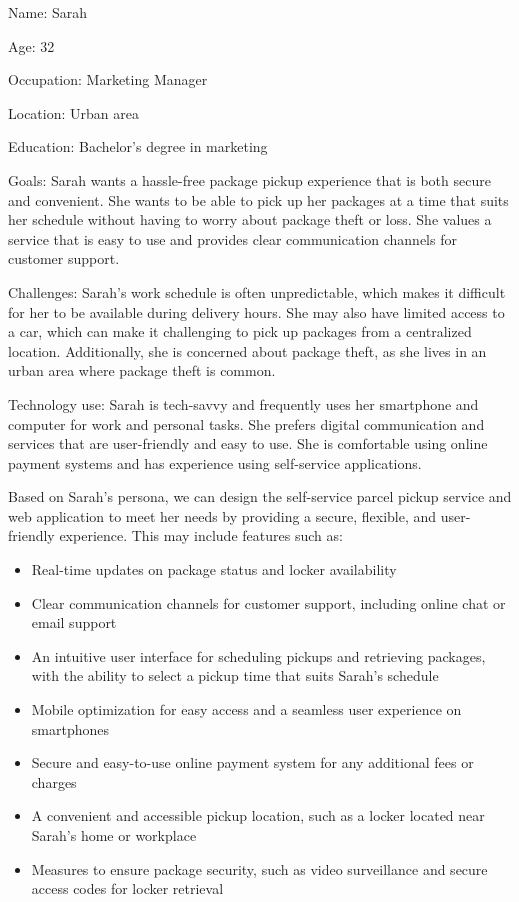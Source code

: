 Name: Sarah

Age: 32

Occupation: Marketing Manager

Location: Urban area

Education: Bachelor's degree in marketing

Goals: Sarah wants a hassle-free package pickup experience that is both secure and convenient. She wants to be able to pick up her packages at a time that suits her schedule without having to worry about package theft or loss. She values a service that is easy to use and provides clear communication channels for customer support.

Challenges: Sarah's work schedule is often unpredictable, which makes it difficult for her to be available during delivery hours. She may also have limited access to a car, which can make it challenging to pick up packages from a centralized location. Additionally, she is concerned about package theft, as she lives in an urban area where package theft is common.

Technology use: Sarah is tech-savvy and frequently uses her smartphone and computer for work and personal tasks. She prefers digital communication and services that are user-friendly and easy to use. She is comfortable using online payment systems and has experience using self-service applications.

Based on Sarah's persona, we can design the self-service parcel pickup service and web application to meet her needs by providing a secure, flexible, and user-friendly experience. This may include features such as:
\begin{itemize}
    \item Real-time updates on package status and locker availability
    \item Clear communication channels for customer support, including online chat or email support
    \item An intuitive user interface for scheduling pickups and retrieving packages, with the ability to select a pickup time that suits Sarah's schedule
    \item Mobile optimization for easy access and a seamless user experience on smartphones
    \item Secure and easy-to-use online payment system for any additional fees or charges
    \item A convenient and accessible pickup location, such as a locker located near Sarah's home or workplace
    \item Measures to ensure package security, such as video surveillance and secure access codes for locker retrieval
\end{itemize}
